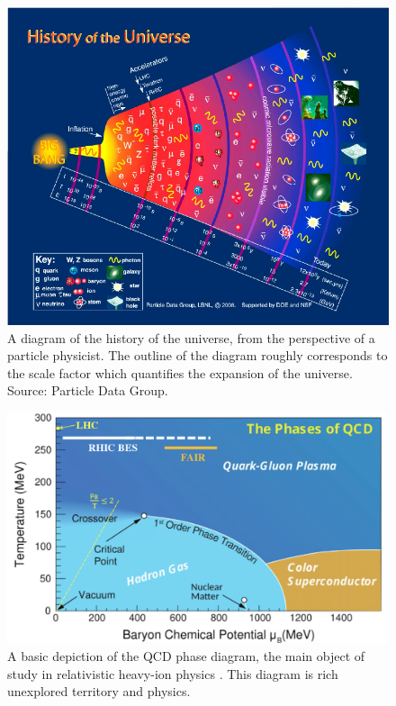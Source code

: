 \documentclass[../main.tex]{subfiles}
\begin{document}
\begin{figure}[h!]
    \centering
    \includegraphics[scale=0.34]{introduction/figs/cosmology.png}
    \caption{A diagram of the history of the universe, from the perspective of a particle physicist. The outline of the diagram roughly corresponds to the scale factor which quantifies the expansion of the universe. Source: Particle Data Group.}
    \label{fig:cosmo}
\end{figure}

\begin{figure}[h!]
    \centering
    \includegraphics[scale=0.24]{introduction/figs/phasediagram.png}
    \caption{A basic depiction of the QCD phase diagram, the main object of study in relativistic heavy-ion physics \cite{Aprahamian:2015qub}. This diagram is rich unexplored territory and physics.}
    \label{fig:phase_diagram}
\end{figure}
\end{document}
